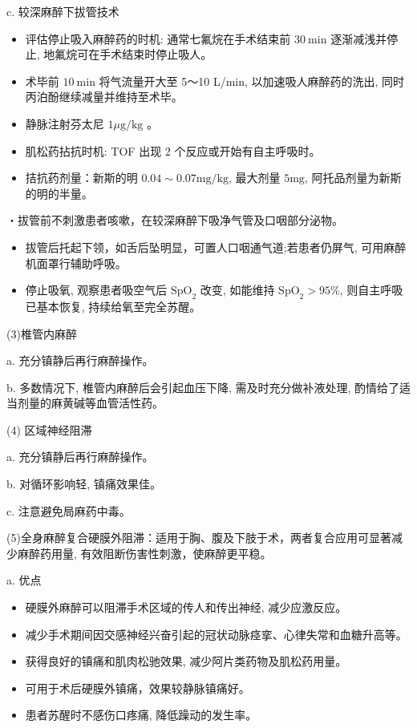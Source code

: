 \documentclass[10pt]{article}
\begin{document}
c. 较深麻醉下拔管技术

\begin{itemize}
  \item 评估停止吸入麻醉药的时机: 通常七氟烷在手术结束前 $30 \mathrm{~min}$ 逐渐减浅并停止, 地氟烷可在手术结束时停止吸人。
  \item 术毕前 $10 \mathrm{~min}$ 将气流量开大至 5～10 L/min, 以加速吸人麻醉药的洗出, 同时丙泊酚继续减量并维持至术毕。
  \item 静脉注射芬太尼 $1 \mu \mathrm{g} / \mathrm{kg}$ 。
  \item 肌松药拈抗时机: TOF 出现 2 个反应或开始有自主呼吸时。
  \item 拮抗药剂量：新斯的明 $0.04 \sim 0.07 \mathrm{mg} / \mathrm{kg}$, 最大剂量 $5 \mathrm{mg}$, 阿托品剂量为新斯的明的半量。
\end{itemize}

・拔管前不刺激患者咳嗽，在较深麻醉下吸净气管及口咽部分泌物。

\begin{itemize}
  \item 拔管后托起下领，如舌后坠明显，可置人口咽通气道;若患者仍屏气, 可用麻醉机面罩行辅助呼吸。
  \item 停止吸氧, 观察患者吸空气后 $\mathrm{SpO}_{2}$ 改变, 如能维持 $\mathrm{SpO}_{2}>95 \%$, 则自主呼吸已基本恢复, 持续给氧至完全苏醒。
\end{itemize}

(3)椎管内麻醉

a. 充分镇静后再行麻醉操作。

b. 多数情况下, 椎管内麻醉后会引起血压下降, 需及时充分做补液处理, 酌情给了适当剂量的麻黄碱等血管活性药。

(4) 区域神经阻滞

a. 充分镇静后再行麻醉操作。

b. 对循环影响轻, 镇痛效果佳。

c. 注意避免局麻药中毒。

(5)全身麻醉复合硬膜外阻滞：适用于胸、腹及下肢于术，两者复合应用可显著减少麻醉药用量, 有效阻断伤害性刺激，使麻醉更平稳。

a. 优点

\begin{itemize}
  \item 硬膜外麻醉可以阻滞手术区域的传人和传出神经, 减少应激反应。
  \item 减少手术期间因交感神经兴奋引起的冠状动脉痉挛、心律失常和血糖升高等。
  \item 获得良好的镇痛和肌肉松驰效果, 减少阿片类药物及肌松药用量。
  \item 可用于术后硬膜外镇痛，效果较静脉镇痛好。
  \item 患者苏醒时不感伤口疼痛, 降低躁动的发生率。
\end{itemize}
\end{document}
